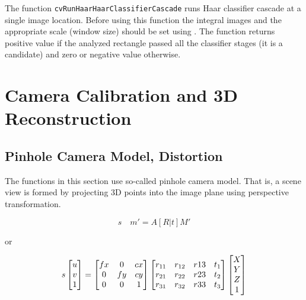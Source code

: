 
\begin{description}
\end{description}

The function \texttt{cvRunHaarHaarClassifierCascade} runs Haar classifier
cascade at a single image location. Before using this function the
integral images and the appropriate scale (window size) should be set
using . The function returns
positive value if the analyzed rectangle passed all the classifier stages
(it is a candidate) and zero or negative value otherwise.

\section{Camera Calibration and 3D Reconstruction}

\subsection{Pinhole Camera Model, Distortion}

The functions in this section use so-called pinhole camera model. That
is, a scene view is formed by projecting 3D points into the image plane
using perspective transformation.

\[
s \quad m' = A [R|t] M'
\]

or

\[
s \begin{bmatrix} u\\ v\\ 1 \end{bmatrix} = \begin{bmatrix} fx & 0 & cx\\ 0 & fy & cy\\ 0 & 0 & 1 \end{bmatrix}
\begin{bmatrix}
 r_{11} & r_{12} & r{13} & t_1 \\
 r_{21} & r_{22} & r{23} & t_2 \\
 r_{31} & r_{32} & r{33} & t_3
\end{bmatrix}
\begin{bmatrix}X\\Y\\Z\\1 \end{bmatrix}
\]

